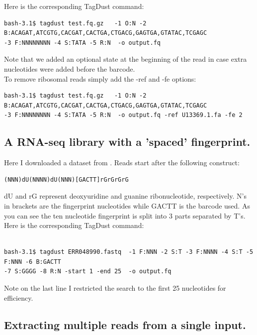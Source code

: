 \documentclass[11pt,a4paper,oneside]{book}
\begin{document}
Here is the corresponding TagDust command: 


{\small
\begin{verbatim}
bash-3.1$ tagdust test.fq.gz   -1 O:N -2 B:ACAGAT,ATCGTG,CACGAT,CACTGA,CTGACG,GAGTGA,GTATAC,TCGAGC
-3 F:NNNNNNNN -4 S:TATA -5 R:N  -o output.fq
\end{verbatim}
}

Note that we added an optional state at the beginning of the read in case extra nucleotides were added before the barcode.  \\ 

To remove ribosomal reads simply add the -ref and -fe options:

{\small
\begin{verbatim}
bash-3.1$ tagdust test.fq.gz   -1 O:N -2 B:ACAGAT,ATCGTG,CACGAT,CACTGA,CTGACG,GAGTGA,GTATAC,TCGAGC
-3 F:NNNNNNNN -4 S:TATA -5 R:N  -o output.fq -ref U13369.1.fa -fe 2 
\end{verbatim}
}




\subsection{A RNA-seq library with a 'spaced' fingerprint.}

Here I downloaded a dataset from \cite{Kivioja:2012kg}. Reads start after the following construct:

{
\begin{verbatim}
(NNN)dU(NNNN)dU(NNN)[GACTT]rGrGrGrG
\end{verbatim}
}
dU and rG represent deoxyuridine and guanine ribonucleotide, respectively. N's in brackets are the fingerprint nucleotides while GACTT is the barcode used. As you can see the ten nucleotide fingerprint is split into 3 parts separated by T's. \\

Here is the corresponding TagDust command: 


{\small
\begin{verbatim}

bash-3.1$ tagdust ERR048990.fastq  -1 F:NNN -2 S:T -3 F:NNNN -4 S:T -5 F:NNN -6 B:GACTT
-7 S:GGGG -8 R:N -start 1 -end 25  -o output.fq
\end{verbatim}
}

Note on the last line I restricted the search to the first 25 nucleotides for efficiency. 


\subsection{Extracting multiple reads from a single input.}
\end{document}
